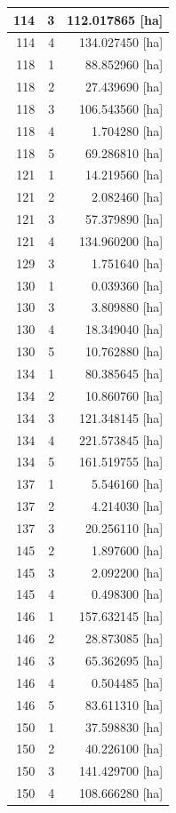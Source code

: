 \documentclass[11pt,]{book}
\begin{document}
\begin{table}
\begin{tabular}[t]{r|r|r}
\hline
114 & 3 & 112.017865 [ha]\\
\hline
114 & 4 & 134.027450 [ha]\\
\hline
118 & 1 & 88.852960 [ha]\\
\hline
118 & 2 & 27.439690 [ha]\\
\hline
118 & 3 & 106.543560 [ha]\\
\hline
118 & 4 & 1.704280 [ha]\\
\hline
118 & 5 & 69.286810 [ha]\\
\hline
121 & 1 & 14.219560 [ha]\\
\hline
121 & 2 & 2.082460 [ha]\\
\hline
121 & 3 & 57.379890 [ha]\\
\hline
121 & 4 & 134.960200 [ha]\\
\hline
129 & 3 & 1.751640 [ha]\\
\hline
130 & 1 & 0.039360 [ha]\\
\hline
130 & 3 & 3.809880 [ha]\\
\hline
130 & 4 & 18.349040 [ha]\\
\hline
130 & 5 & 10.762880 [ha]\\
\hline
134 & 1 & 80.385645 [ha]\\
\hline
134 & 2 & 10.860760 [ha]\\
\hline
134 & 3 & 121.348145 [ha]\\
\hline
134 & 4 & 221.573845 [ha]\\
\hline
134 & 5 & 161.519755 [ha]\\
\hline
137 & 1 & 5.546160 [ha]\\
\hline
137 & 2 & 4.214030 [ha]\\
\hline
137 & 3 & 20.256110 [ha]\\
\hline
145 & 2 & 1.897600 [ha]\\
\hline
145 & 3 & 2.092200 [ha]\\
\hline
145 & 4 & 0.498300 [ha]\\
\hline
146 & 1 & 157.632145 [ha]\\
\hline
146 & 2 & 28.873085 [ha]\\
\hline
146 & 3 & 65.362695 [ha]\\
\hline
146 & 4 & 0.504485 [ha]\\
\hline
146 & 5 & 83.611310 [ha]\\
\hline
150 & 1 & 37.598830 [ha]\\
\hline
150 & 2 & 40.226100 [ha]\\
\hline
150 & 3 & 141.429700 [ha]\\
\hline
150 & 4 & 108.666280 [ha]\\

\end{tabular}
\end{table}
\end{document}
